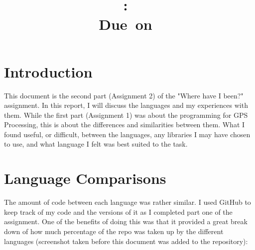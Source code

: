 \documentclass{article}
\title{
\vspace{2in}
\textmd{\textbf{\hmwkClass:\ \hmwkTitle}}\\
\normalsize\vspace{0.1in}\small{Due\ on\ \hmwkDueDate}\\
\vspace{3in}
}
\author{\textbf{\hmwkAuthorName}}
\date{} %
\begin{document}
\maketitle



\newpage
\tableofcontents
\newpage



\section{Introduction}
This document is the second part (Assignment 2\cite{assignment}) of the "Where have I been?" assignment. In this report, I will discuss the languages and my experiences with them. While the first part (Assignment 1) was about the programming for GPS Processing, this is about the differences and similarities between them. What I found useful, or difficult, between the languages, any libraries I may have chosen to use, and what language I felt was best suited to the task.



\section{Language Comparisons}

The amount of code between each language was rather similar. I used GitHub to keep track of my code and the versions of it as I completed part one of the assignment. One of the benefits of doing this was that it provided a great break down of how much percentage of the repo was taken up by the different languages (screenshot taken before this document was added to the repository):
\end{document}
